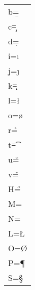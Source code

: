 \documentclass{standalone}%
\begin{document}
\begin{tabular}{l}
b=\b{} \\
c=\c{} \\
d=\d{} \\
i=\i{} \\
j=\j{} \\
k=\k{} \\
l=\l{} \\
o=\o{} \\
r=\r{} \\
t=\t{} \\
u=\u{} \\
v=\v{} \\
H=\H{} \\
M=\M{} \\
N=\N{} \\
L=\L{} \\
O=\O{} \\
P=\P{} \\
S=\S{}
\end{tabular}
\end{document}
